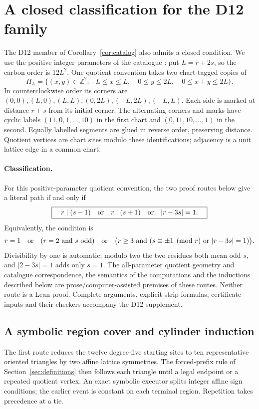 \documentclass[11pt]{amsart}
\newcommand{\Z}{\mathbb Z}
\newcommand{\record}[1]{\nolinkurl{#1}}
\newcommand{\claimid}[1]{\par\nopagebreak\noindent\textit{Machine-readable claim:} \record{#1}.\par}
\theoremstyle{definition}\newtheorem{definition}{Definition}
\begin{document}
\section{A closed classification for the D12 family}\label{sec:d12-classification}
The D12 member of Corollary~\ref{cor:catalog} also admits a closed
condition. We use the positive integer parameters of the catalogue
\cite{Graver}: put $L=r+2s$, so the carbon order is $12L^2$.
One quotient convention takes two chart-tagged copies of
\[
 H_L=\{(x,y)\in\Z^2:-L\le x\le L,\quad 0\le y\le2L,
                            \quad0\le x+y\le2L\}.
\]
In counterclockwise order its corners are
$(0,0),(L,0),(L,L),(0,2L),(-L,2L),(-L,L)$.
Each side is marked at distance $r+s$ from its initial corner.
The alternating corners and marks have cyclic labels
$(11,0,1,\ldots,10)$ in the first chart and
$(0,11,10,\ldots,1)$ in the second. Equally labelled segments
are glued in reverse order, preserving distance. Quotient vertices
are chart sites modulo these identifications; adjacency is a unit
lattice edge in a common chart.

\paragraph{Classification.}\label{thm:d12-classification}
For this positive-parameter quotient convention, the two proof routes
below give a literal path if and only if
\[
 \boxed{\quad r\mid(s-1)\quad\hbox{or}\quad r\mid(s+1)
                     \quad\hbox{or}\quad |r-3s|=1.\quad}
\]
Equivalently, the condition is
\[
 r=1\quad\hbox{or}\quad(r=2\ \hbox{and }s\hbox{ odd})\quad\hbox{or}\quad
 \bigl(r\ge3\ \hbox{and }(s\equiv\pm1\pmod r\ \hbox{or }|r-3s|=1)\bigr).
\]
Divisibility by one is automatic; modulo two the two residues both
mean odd $s$, and $|2-3s|=1$ adds only $s=1$.
The all-parameter quotient geometry and catalogue correspondence,
the semantics of the computations and the inductions described below
are prose/computer-assisted premises of these routes. Neither route
is a Lean proof. Complete arguments, explicit strip formulas,
certificate inputs and their checkers accompany the D12 supplement.

\subsection{A symbolic region cover and cylinder induction}
The first route reduces the twelve degree-five starting sites to ten
representative oriented triangles by two affine lattice symmetries.
The forced-prefix rule of Section~\ref{sec:definitions} then follows
each triangle until a legal endpoint or a repeated quotient vertex.
An exact symbolic executor splits integer affine sign conditions;
the earlier event is constant on each terminal region. Repetition
takes precedence at a tie.
\end{document}
